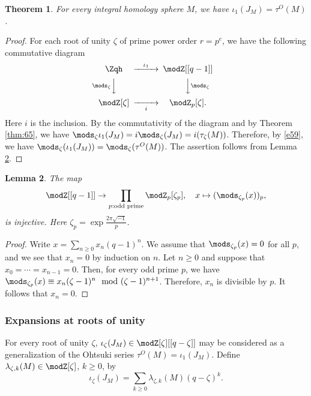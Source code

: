 \documentclass{amsart}
\numberwithin{equation}{section}
\numberwithin{figure}{section}
\theoremstyle{plain}
\newtheorem{theorem}{Theorem}[section]
\newtheorem{lemma}[theorem]{Lemma}
\theoremstyle{definition}
\theoremstyle{remark}
\begin{document}
\begin{theorem}
  \label{r52}
  For every integral homology sphere $M$, we have $\iota _1(J_M)=\tau ^O(M)$.
\end{theorem}

\begin{proof}
  For each root of unity $\zeta $ of prime power order $r=p^e$, we have
  the following commutative diagram
  \begin{equation*}
    \begin{CD}
      \Zqh @>\iota _1>> \modZ [[q-1]]\\
      @V\mods _\zeta VV @VV\mods _\zeta V\\
      \modZ [\zeta ] @>>i> \modZ _p[\zeta ].
    \end{CD}
  \end{equation*}
  Here $i$ is the inclusion.  By the commutativity of the diagram and
  by Theorem \ref{thm:65}, we have
  $\mods _\zeta \iota _1(J_M)=i\mods _\zeta (J_M)=i(\tau _\zeta (M))$.  Therefore, by \eqref{e59},
  we have $\mods _\zeta (\iota _1(J_M))=\mods _\zeta (\tau ^O(M))$.  The assertion follows from
  Lemma \ref{lem:8}.
\end{proof}

\begin{lemma}
  \label{lem:8}
  The map
  \begin{equation*}
    \modZ [[q-1]]\rightarrow \prod_{p:\text{odd prime}}\modZ _p[\zeta _p],\quad
    x\mapsto(\mods _{\zeta _p}(x))_p,
  \end{equation*}
  is injective.  Here $\zeta _p=\exp\frac{2\pi \sqrt{-1}}{p}$.
\end{lemma}

\begin{proof}
  Write $x=\sum_{n\ge 0}x_n(q-1)^n$.  We assume that $\mods _{\zeta _p}(x)=0$ for
  all $p$, and we see that $x_n=0$ by induction on $n$.  Let $n\ge 0$
  and suppose that $x_0=\cdots=x_{n-1}=0$.  Then, for every odd prime $p$,
  we have $\mods _{\zeta _p}(x)\equiv x_n(\zeta -1)^n\mod (\zeta -1)^{n+1}$.  Therefore,
  $x_n$ is divisible by $p$.  It follows that $x_n=0$.
\end{proof}

\subsubsection{Expansions at roots of unity}
\label{sec:expansions-at-roots}

For every root of unity $\zeta $, $\iota _\zeta (J_M)\in \modZ [\zeta ][[q-\zeta ]]$ may be
considered as a generalization of the Ohtsuki series
$\tau ^O(M)=\iota _1(J_M)$.  Define $\lambda _{\zeta ,k}(M)\in \modZ [\zeta ]$, $k\ge 0$, by
\begin{equation*}
  \iota _\zeta (J_M)=\sum_{k\ge 0}\lambda _{\zeta ,k}(M)(q-\zeta )^k.
\end{equation*}
\end{document}
